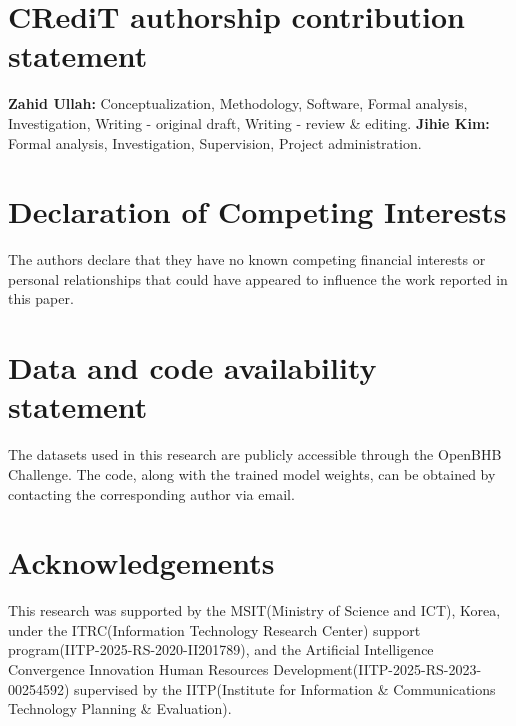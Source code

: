 \documentclass[preprint,12pt]{elsarticle}
\begin{document}
\section*{CRediT authorship contribution statement}
\textbf{Zahid Ullah:} Conceptualization, Methodology, Software, Formal analysis, Investigation, Writing - original draft, Writing - review \& editing.  \textbf{Jihie Kim:} Formal analysis, Investigation, Supervision, Project administration.  

\section*{\textbf{Declaration of Competing Interests}} The authors declare that they have no known competing financial interests or personal relationships that could have appeared to influence the work reported in this paper.

\section{Data and code availability statement}
The datasets used in this research are publicly accessible through the OpenBHB Challenge. The code, along with the trained model weights, can be obtained by contacting the corresponding author via email.

\section*{Acknowledgements}
This research was supported by the MSIT(Ministry of Science and ICT), Korea, under the ITRC(Information Technology Research Center) support program(IITP-2025-RS-2020-II201789), and the Artificial Intelligence Convergence Innovation Human Resources Development(IITP-2025-RS-2023-00254592) supervised by the IITP(Institute for Information \& Communications Technology Planning \& Evaluation).






\end{document}
